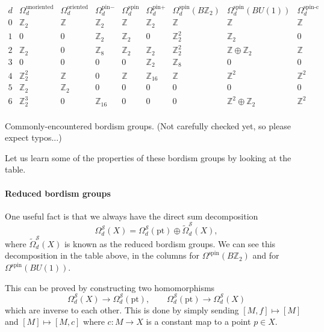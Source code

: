 \documentclass[12pt]{article}
\numberwithin{equation}{section}
\numberwithin{figure}{section}
\theoremstyle{remark}
\renewenvironment{table}[1][]{
  \begin{originaltable}[#1]
    \begin{mdframed}[linecolor=black!0,backgroundcolor=black!1]
}{
    \end{mdframed}
  \end{originaltable}
}
\def\bZ{\mathbb{Z}}
\def\cS{\mathcal{S}}
\def\pt{\mathrm{pt}}
\begin{document}
\begin{table}
\[
\begin{array}{c||cc|ccc|ccccc}
d & \Omega^\text{unoriented}_d & \Omega^\text{oriented}_d &\Omega^\text{pin$-$}_d &
 \Omega^\text{spin}_d & \Omega^\text{pin$+$}_d 
 &  \Omega^\text{spin}_d(B\bZ_2) & \Omega^\text{spin}_d(BU(1)) & \Omega^\text{spin-c}_d\\
\hline
0 & \bZ_2 & \bZ & \bZ_2 & \bZ & \bZ_2 & \bZ & \bZ & \bZ\\
1 & 0 & 0 & \bZ_2 & \bZ_2 & 0 & \bZ_2^2  &\bZ_2& 0 \\
2&  \bZ_2 & 0 & \bZ_8 & \bZ_2 & \bZ_2 & \bZ_2^2& \bZ \oplus \bZ_2 & \bZ \\
3 & 0 & 0 & 0 & 0 & \bZ_2 & \bZ_8 &0&0\\
4 & \bZ_2^2 & \bZ & 0 & \bZ & \bZ_{16} & \bZ &\bZ^2&\bZ^2  \\
5 &  \bZ_2 & \bZ_2& 0 & 0 & 0& 0 & 0 &0 \\
6 &\bZ_2^3 & 0 & \bZ_{16} & 0 & 0 & 0 &\bZ^2 \oplus \bZ_2 & \bZ^2\\
\end{array}
\]
\caption{
Commonly-encountered bordism groups. (Not carefully checked yet, so please expect typos...)
\label{tab:bordism}}
\end{table}

Let us learn some of the properties of these bordism groups by looking at the table.

\paragraph{Reduced bordism groups}
One useful fact is that we always have the direct sum decomposition \begin{equation}
\Omega^\cS_d(X)=\Omega^\cS_d(\pt) \oplus \tilde\Omega^\cS_d(X),
\end{equation}
where $\tilde\Omega^\cS_d(X)$ is known as the reduced bordism groups.
We can see this decomposition in the table above, in the columns for $\Omega^\text{spin}(B\bZ_2)$
and for $\Omega^\text{spin}(BU(1))$.

This can be proved by constructing two homomorphisms \begin{equation}
\Omega^\cS_d(X) \to \Omega^\cS_d(\pt),\qquad
\Omega^\cS_d(\pt) \to \Omega^\cS_d(X)
\end{equation} which are inverse to each other.
This is done by simply sending $[M,f]\mapsto [M]$ and $[M]\mapsto [M,c]$ where 
$c:M\to X$ is a constant map to a point $p\in X$.
\end{document}
